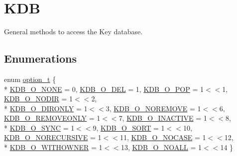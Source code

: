 \hypertarget{group__kdb}{\section{K\-D\-B}
\label{group__kdb}
}


General methods to access the Key database.  


\subsection*{Enumerations}
\begin{DoxyCompactItemize}
\item 
enum \hyperlink{group__kdb_ga98a3d6a4016c9dad9cbd1a99a9c2a45a}{option\-\_\-t} \{ \\*
\hyperlink{group__kdb_gga98a3d6a4016c9dad9cbd1a99a9c2a45aa00738455e0ae843c8720809d8287f370}{K\-D\-B\-\_\-\-O\-\_\-\-N\-O\-N\-E} = 0, 
\hyperlink{group__kdb_gga98a3d6a4016c9dad9cbd1a99a9c2a45aa66a5380c120f25f28f49848c4a863ead}{K\-D\-B\-\_\-\-O\-\_\-\-D\-E\-L} = 1, 
\hyperlink{group__kdb_gga98a3d6a4016c9dad9cbd1a99a9c2a45aa52fb5f2cc86773d393da62bebebf7984}{K\-D\-B\-\_\-\-O\-\_\-\-P\-O\-P} = 1$<$$<$1, 
\hyperlink{group__kdb_gga98a3d6a4016c9dad9cbd1a99a9c2a45aa1a70738b2126badb8db7b012c8a1c610}{K\-D\-B\-\_\-\-O\-\_\-\-N\-O\-D\-I\-R} = 1$<$$<$2, 
\\*
\hyperlink{group__kdb_gga98a3d6a4016c9dad9cbd1a99a9c2a45aa131e99d60253d0b887a1e5886f8aa96c}{K\-D\-B\-\_\-\-O\-\_\-\-D\-I\-R\-O\-N\-L\-Y} = 1$<$$<$3, 
\hyperlink{group__kdb_gga98a3d6a4016c9dad9cbd1a99a9c2a45aa7649f575c2eb0adeaf2c9173ae16e0e6}{K\-D\-B\-\_\-\-O\-\_\-\-N\-O\-R\-E\-M\-O\-V\-E} = 1$<$$<$6, 
\hyperlink{group__kdb_gga98a3d6a4016c9dad9cbd1a99a9c2a45aaf6ed09cee8aa8cf0d6a0e318a7105440}{K\-D\-B\-\_\-\-O\-\_\-\-R\-E\-M\-O\-V\-E\-O\-N\-L\-Y} = 1$<$$<$7, 
\hyperlink{group__kdb_gga98a3d6a4016c9dad9cbd1a99a9c2a45aa789926d8a8e15b029cf7dded4154bcda}{K\-D\-B\-\_\-\-O\-\_\-\-I\-N\-A\-C\-T\-I\-V\-E} = 1$<$$<$8, 
\\*
\hyperlink{group__kdb_gga98a3d6a4016c9dad9cbd1a99a9c2a45aaa7d5265eacbb1590982b718f35443e2e}{K\-D\-B\-\_\-\-O\-\_\-\-S\-Y\-N\-C} = 1$<$$<$9, 
\hyperlink{group__kdb_gga98a3d6a4016c9dad9cbd1a99a9c2a45aad9d03b36ee88ca5a774cc01b190c99b8}{K\-D\-B\-\_\-\-O\-\_\-\-S\-O\-R\-T} = 1$<$$<$10, 
\hyperlink{group__kdb_gga98a3d6a4016c9dad9cbd1a99a9c2a45aa6adaa17b267027ce50e670bf8cc6e824}{K\-D\-B\-\_\-\-O\-\_\-\-N\-O\-R\-E\-C\-U\-R\-S\-I\-V\-E} = 1$<$$<$11, 
\hyperlink{group__kdb_gga98a3d6a4016c9dad9cbd1a99a9c2a45aaa5586d229e048f816bf7982765442b86}{K\-D\-B\-\_\-\-O\-\_\-\-N\-O\-C\-A\-S\-E} = 1$<$$<$12, 
\\*
\hyperlink{group__kdb_gga98a3d6a4016c9dad9cbd1a99a9c2a45aab2ff402f5de9aa67b7f786fb715a7a31}{K\-D\-B\-\_\-\-O\-\_\-\-W\-I\-T\-H\-O\-W\-N\-E\-R} = 1$<$$<$13, 
\hyperlink{group__kdb_gga98a3d6a4016c9dad9cbd1a99a9c2a45aae8dd1961707e7d0c27228a3f98b0a94d}{K\-D\-B\-\_\-\-O\-\_\-\-N\-O\-A\-L\-L} = 1$<$$<$14
 \}
\end{DoxyCompactItemize}
